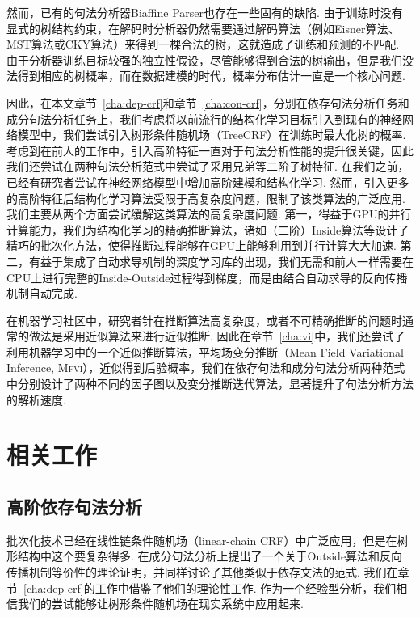 然而，已有的句法分析器Biaffine Parser也存在一些固有的缺陷.
由于训练时没有显式的树结构约束，在解码时分析器仍然需要通过解码算法（例如Eisner算法、MST算法或CKY算法）来得到一棵合法的树，这就造成了训练和预测的不匹配.
由于分析器训练目标较强的独立性假设，尽管能够得到合法的树输出，但是我们没法得到相应的树概率，而在数据建模的时代，概率分布估计一直是一个核心问题\citep{le-zuidema-2014-inside}.

因此，在本文章节~\ref{cha:dep-crf}和章节~\ref{cha:con-crf}，分别在依存句法分析任务和成分句法分析任务上，我们考虑将以前流行的结构化学习目标引入到现有的神经网络模型中，我们尝试引入树形条件随机场（TreeCRF）在训练时最大化树的概率.
考虑到在前人的工作中，引入高阶特征一直对于句法分析性能的提升\citet{mcdonald-pereira-2006-online,chen-manning-2014-fast}很关键，因此我们还尝试在两种句法分析范式中尝试了采用兄弟等二阶子树特征.
在我们之前，已经有研究者尝试在神经网络模型中增加高阶建模和结构化学习\citep{zhang-etal-2019-empirical,falenska-kuhn-2019-non}.
然而，引入更多的高阶特征后结构化学习算法受限于高复杂度问题，限制了该类算法的广泛应用.
我们主要从两个方面尝试缓解这类算法的高复杂度问题.
第一，得益于GPU的并行计算能力，我们为结构化学习的精确推断算法，诸如（二阶）Inside算法等设计了精巧的批次化方法，使得推断过程能够在GPU上能够利用到并行计算大大加速.
第二，有益于集成了自动求导机制的深度学习库的出现，我们无需和前人一样需要在CPU上进行完整的Inside-Outside过程得到梯度，而是由结合自动求导的反向传播机制自动完成.

在机器学习社区中，研究者针在推断算法高复杂度，或者不可精确推断的问题时通常的做法是采用近似算法来进行近似推断.
因此在章节~\ref{cha:vi}中，我们还尝试了利用机器学习中的一个近似推断算法，平均场变分推断（Mean Field Variational Inference, \textsc{Mfvi}），近似得到后验概率，我们在依存句法和成分句法分析两种范式中分别设计了两种不同的因子图以及变分推断迭代算法，显著提升了句法分析方法的解析速度.

\section{相关工作}
\label{sec:relworks}

\subsection{高阶依存句法分析}

批次化技术已经在线性链条件随机场（linear-chain CRF）中广泛应用，但是在树形结构中这个要复杂得多.
\citet{eisner-2016-inside}在成分句法分析上提出了一个关于Outside算法和反向传播机制等价性的理论证明，并同样讨论了其他类似于依存文法的范式.
我们在章节~\ref{cha:dep-crf}的工作中借鉴了他们的理论性工作.
作为一个经验型分析，我们相信我们的尝试能够让树形条件随机场在现实系统中应用起来.

